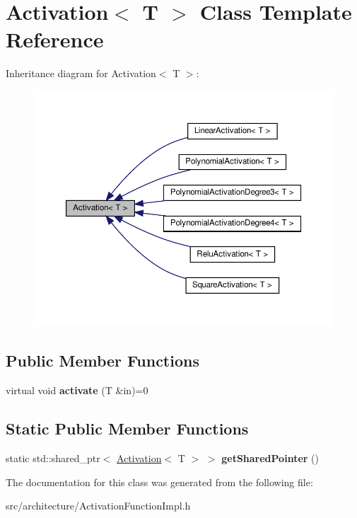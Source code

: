 \hypertarget{classActivation}{}\section{Activation$<$ T $>$ Class Template Reference}
\label{classActivation}


Inheritance diagram for Activation$<$ T $>$\+:
\nopagebreak
\begin{figure}[H]
\begin{center}
\leavevmode
\includegraphics[width=350pt]{classActivation__inherit__graph}
\end{center}
\end{figure}
\subsection*{Public Member Functions}
\begin{DoxyCompactItemize}
\item 
\mbox{\label{classActivation_aeffc71e7421ef3ff2b40550744a19af3}} 
virtual void {\bfseries activate} (T \&in)=0
\end{DoxyCompactItemize}
\subsection*{Static Public Member Functions}
\begin{DoxyCompactItemize}
\item 
\mbox{\label{classActivation_a20a28e39ac312019885e08f115fe2268}} 
static std\+::shared\+\_\+ptr$<$ \hyperlink{classActivation}{Activation}$<$ T $>$ $>$ {\bfseries get\+Shared\+Pointer} ()
\end{DoxyCompactItemize}


The documentation for this class was generated from the following file\+:\begin{DoxyCompactItemize}
\item 
src/architecture/Activation\+Function\+Impl.\+h\end{DoxyCompactItemize}
